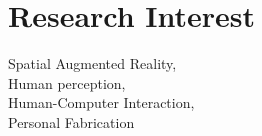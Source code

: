 \documentclass[]{resume-enhanced}
\begin{document}
\begin{minipage}[t]{0.40\textwidth} 
	
\section{Research Interest}
Spatial Augmented Reality, \\
Human perception, \\
Human-Computer Interaction, \\
Personal Fabrication
\sectionsep




\end{minipage}


\end{document}
